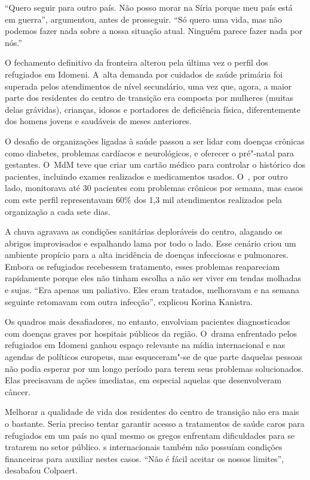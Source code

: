 ``Quero seguir para outro país. Não posso morar na Síria porque meu país
está em guerra'', argumentou, antes de prosseguir. ``Só quero uma vida, mas não
podemos fazer nada sobre a nossa situação atual. Ninguém parece fazer
nada por nós.''

O fechamento definitivo da fronteira alterou pela última vez o perfil
dos refugiados em Idomeni. A~alta demanda por cuidados de saúde primária
foi superada pelos atendimentos de nível secundário, uma vez que, agora, a maior
parte dos residentes do centro de transição era composta por
mulheres (muitas delas grávidas), crianças, idosos e portadores
de deficiência física, diferentemente dos homens jovens e saudáveis de
meses anteriores.

O desafio de organizações ligadas à saúde passou a ser lidar com doenças
crônicas como diabetes, problemas cardíacos e neurológicos, e oferecer o
pré"-natal para gestantes. O~MdM teve que criar um cartão médico para
controlar o histórico dos pacientes, incluindo exames realizados e
medicamentos usados. O~, por outro lado, monitorava até 30 pacientes
com problemas crônicos por semana, mas casos com este perfil
representavam 60\% dos 1,3 mil atendimentos realizados pela organização
a cada sete dias.

A chuva agravava as condições sanitárias deploráveis do centro, alagando
os abrigos improvisados e espalhando lama por todo o lado. Esse cenário
criou um ambiente propício para a alta incidência de doenças infecciosas
e pulmonares. Embora os refugiados recebessem tratamento, esses
problemas reapareciam rapidamente porque eles não tinham escolha a não
ser viver em tendas molhadas e sujas. ``Era apenas um paliativo. Eles
eram tratados, melhoravam e na semana seguinte retomavam com outra
infecção'', explicou Korina Kanistra.

Os quadros mais desafiadores, no entanto, envolviam pacientes
diagnosticados com doenças graves por hospitais públicos da região. O~drama enfrentado pelos refugiados em Idomeni ganhou espaço relevante na
mídia internacional e nas agendas de políticos europeus, mas esqueceram"-se
de que parte daquelas pessoas não podia esperar por um longo período
para terem seus problemas solucionados. Elas precisavam de ações
imediatas, em especial aquelas que desenvolveram câncer.

Melhorar a qualidade de vida dos residentes do centro de transição não
era mais o bastante. Seria preciso tentar garantir acesso a tratamentos
de saúde caros para refugiados em um país no qual mesmo os gregos
enfrentam dificuldades para se tratarem no setor público. s
internacionais também não possuíam condições financeiras para auxiliar
nestes casos. ``Não é fácil aceitar os nossos limites'', desabafou
Colpaert.

